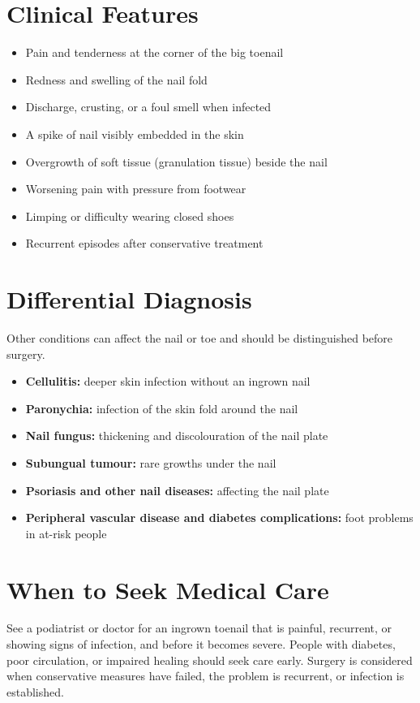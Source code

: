 \section*{Clinical Features}
\begin{itemize}
    \item Pain and tenderness at the corner of the big toenail
    \item Redness and swelling of the nail fold
    \item Discharge, crusting, or a foul smell when infected
    \item A spike of nail visibly embedded in the skin
    \item Overgrowth of soft tissue (granulation tissue) beside the nail
    \item Worsening pain with pressure from footwear
    \item Limping or difficulty wearing closed shoes
    \item Recurrent episodes after conservative treatment
\end{itemize}

\section*{Differential Diagnosis}
Other conditions can affect the nail or toe and should be distinguished before surgery.
\begin{itemize}
    \item \textbf{Cellulitis:} deeper skin infection without an ingrown nail
    \item \textbf{Paronychia:} infection of the skin fold around the nail
    \item \textbf{Nail fungus:} thickening and discolouration of the nail plate
    \item \textbf{Subungual tumour:} rare growths under the nail
    \item \textbf{Psoriasis and other nail diseases:} affecting the nail plate
    \item \textbf{Peripheral vascular disease and diabetes complications:} foot problems in at-risk people
\end{itemize}

\section*{When to Seek Medical Care}
See a podiatrist or doctor for an ingrown toenail that is painful, recurrent, or showing signs of infection, and before it becomes severe. People with diabetes, poor circulation, or impaired healing should seek care early. Surgery is considered when conservative measures have failed, the problem is recurrent, or infection is established.

